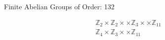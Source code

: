 \documentclass[12pt,letterpaper,boxed]{maths_v5}
\begin{document}
\begin{center}
Finite Abelian Groups of Order: 132\newline 
\end{center}
\begin{align}\mathbb{Z}_{2}\times \mathbb{Z}_{2}\times \times \mathbb{Z}_{3}\times \times \mathbb{Z}_{11}\\\mathbb{Z}_{4}\times \mathbb{Z}_{3}\times \times \mathbb{Z}_{11}\end{align}
\end{document}
